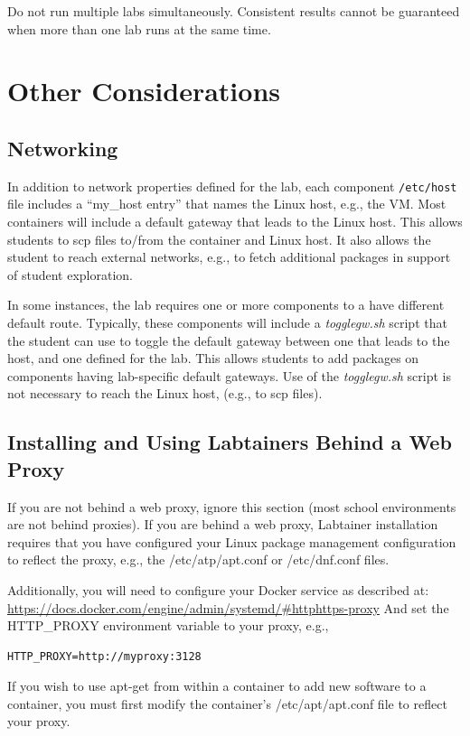 \documentclass[12pt]{article}
\begin{document}
Do not run multiple labs simultaneously.  Consistent results cannot be guaranteed when more than one lab runs at the same time.

\section{Other Considerations}
\subsection{Networking}
In addition to network properties defined for the lab,
each component \texttt{/etc/host} file includes a ``my\_host entry'' that names
the Linux host, e.g., the VM.  Most containers will include a default gateway that
leads to the Linux host.  This allows students to scp files to/from the container and Linux host.
It also allows the student to reach external networks, e.g., to fetch additional packages in
support of student exploration.

In some instances, the lab requires one or more components to a have different default route.
Typically, these components will include a \textit{togglegw.sh} script that the student
can use to toggle the default gateway between one that leads to the host, and one defined for the lab.
This allows students to add packages on components having lab-specific default gateways.
Use of the \textit{togglegw.sh} script is not necessary to reach the Linux host, (e.g., to scp files).


\subsection{Installing and Using Labtainers Behind a Web Proxy}
If you are not behind a web proxy, ignore this section (most school environments
are not behind proxies). 
If you are behind a web proxy, Labtainer installation
requires that you have configured your Linux package management configuration to reflect
the proxy, e.g., the /etc/atp/apt.conf or /etc/dnf.conf files.  

Additionally, you will need to configure your Docker service as described at:
\url{https://docs.docker.com/engine/admin/systemd/#httphttps-proxy}
And set the HTTP\_PROXY environment variable to your proxy, e.g., 
\begin{verbatim}
HTTP_PROXY=http://myproxy:3128
\end{verbatim}
If you wish to use apt-get from within a container to add new software to a container, you
must first modify the container's /etc/apt/apt.conf file to reflect your proxy.
\end{document}
